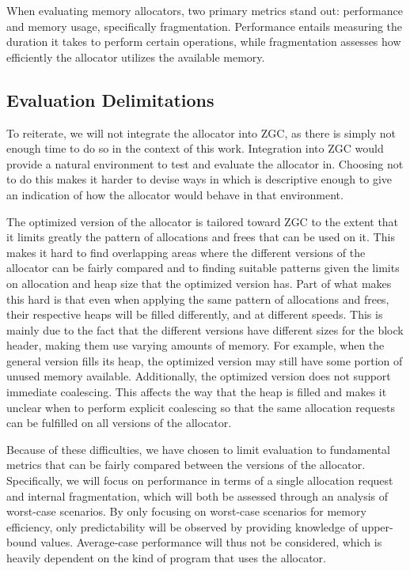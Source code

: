 
When evaluating memory allocators, two primary metrics stand out: performance and memory usage, specifically fragmentation. Performance entails measuring the duration it takes to perform certain operations, while fragmentation assesses how efficiently the allocator utilizes the available memory.

\subsection{Evaluation Delimitations}

To reiterate, we will not integrate the allocator into ZGC, as there is simply not enough time to do so in the context of this work. Integration into ZGC would provide a natural environment to test and evaluate the allocator in. Choosing not to do this makes it harder to devise ways in which is descriptive enough to give an indication of how the allocator would behave in that environment. 

The optimized version of the allocator is tailored toward ZGC to the extent that it limits greatly the pattern of allocations and frees that can be used on it. This makes it hard to find overlapping areas where the different versions of the allocator can be fairly compared and to finding suitable patterns given the limits on allocation and heap size that the optimized version has. Part of what makes this hard is that even when applying the same pattern of allocations and frees, their respective heaps will be filled differently, and at different speeds. This is mainly due to the fact that the different versions have different sizes for the block header, making them use varying amounts of memory. For example, when the general version fills its heap, the optimized version may still have some portion of unused memory available. Additionally, the optimized version does not support immediate coalescing. This affects the way that the heap is filled and makes it unclear when to perform explicit coalescing so that the same allocation requests can be fulfilled on all versions of the allocator.

Because of these difficulties, we have chosen to limit evaluation to fundamental metrics that can be fairly compared between the versions of the allocator. Specifically, we will focus on performance in terms of a single allocation request and internal fragmentation, which will both be assessed through an analysis of worst-case scenarios. By only focusing on worst-case scenarios for memory efficiency, only predictability will be observed by providing knowledge of upper-bound values. Average-case performance will thus not be considered, which is heavily dependent on the kind of program that uses the allocator.

